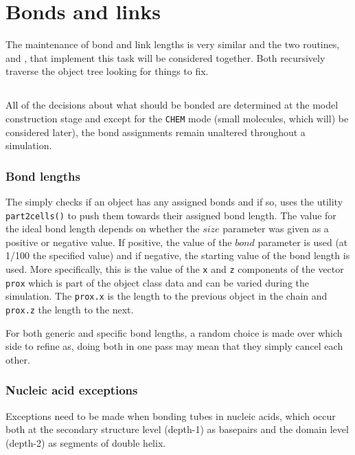 \section{Bonds and links}

The maintenance of bond and link lengths is very similar and the two routines,
 and , that implement this task will be considered together.
Both recursively traverse the object tree looking for things to fix.

\subsection{}

All of the decisions about what should be bonded are determined at the model
construction stage and except for the {\tt CHEM} mode (small molecules, which will)
be considered later), the bond assignments remain unaltered throughout a simulation.

\subsubsection{Bond lengths}

The  simply checks if an object has any assigned bonds and if so, uses
the utility {\tt part2cells()} to push them towards their assigned bond length.
The value for the ideal bond length depends on whether the $size$ parameter was 
given as a positive or negative value.  If positive, the value of the $bond$ 
parameter is used (at 1/100 the specified value) and if negative, the starting
value of the bond length is used.   More specifically, this is the value of the
{\tt x} and {\tt z} components of the vector {\tt prox} which is part of the object
class data and can be varied during the simulation.   The {\tt prox.x} is the length
to the previous object in the chain and  {\tt prox.z} the length to the next.

For both generic and specific bond lengths, a random choice is made over which side
to refine as, doing both in one pass may mean that they simply cancel each other.

\subsubsection{Nucleic acid exceptions}

Exceptions need to be made when bonding tubes in nucleic acids, which occur both at
the secondary structure level (depth-1) as basepairs and the domain level (depth-2)
as segments of double helix. 

